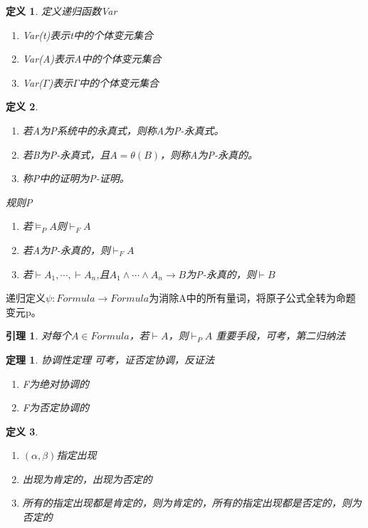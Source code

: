 \documentclass[a4paper]{ctexart}
\newtheorem{thm}{\hspace{2em}定理}[subsection]
\newtheorem{lem}{\hspace{2em}引理}
\newtheorem{defi}{\hspace{2em}定义}[subsection]
\newcommand{\shade}[1]{\colorbox{shadecolor}{#1}}
\begin{document}
\begin{defi}
  定义递归函数Var
  \begin{enumerate}[itemindent=2em]
    \item Var(t)表示t中的个体变元集合
    \item Var(A)表示A中的个体变元集合
    \item Var($\Gamma$)表示$\Gamma$中的个体变元集合
  \end{enumerate}
\end{defi}

\begin{defi}
  \begin{enumerate}[itemindent=2em]
    \item 若A为P系统中的永真式，则称A为P-永真式。
    \item 若B为P-永真式，且$A=\theta(B)$，则称A为P-永真的。
    \item 称P中的证明为P-证明。
  \end{enumerate}
  \emph{规则P}
  \begin{enumerate}[itemindent=3em]
    \item 若$\models_PA$则$\vdash_FA$
    \item 若A为P-永真的，则$\vdash_FA$
    \item 若$\vdash A_1,\cdots,\vdash A_n$,且$A_1\wedge\cdots\wedge A_n\rightarrow B$为P-永真的，则$\vdash B$
  \end{enumerate}
\end{defi}

递归定义$\psi:Formula\rightarrow Formula$为消除A中的所有量词，将原子公式全转为命题变元p。
\begin{lem}
  对每个$A\in Formula$，若$\vdash A$，则$\vdash_PA$ \shade{重要手段，可考，第二归纳法}
\end{lem}

\begin{thm}
  协调性定理 \shade{可考，证否定协调，反证法}
  \begin{enumerate}[itemindent=2em]
    \item F为绝对协调的
    \item F为否定协调的 
  \end{enumerate}
\end{thm}

\begin{defi}
  \begin{enumerate}[itemindent=2em]
    \item $(\alpha,\beta)$指定出现
    \item 出现为肯定的，出现为否定的
    \item 所有的指定出现都是肯定的，则为肯定的，所有的指定出现都是否定的，则为否定的
  \end{enumerate}
\end{defi}
\end{document}
